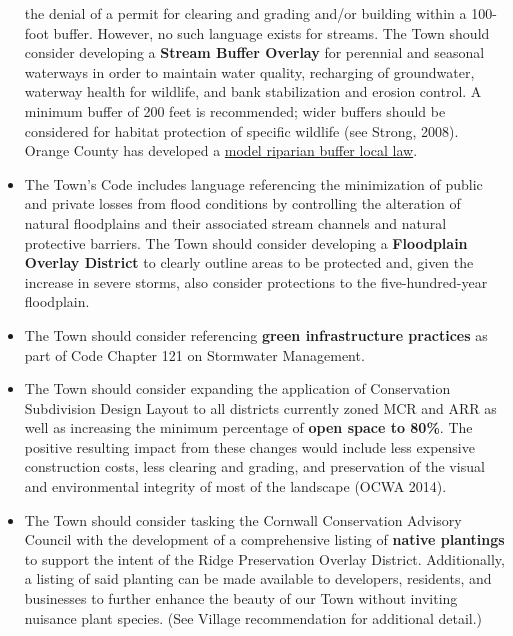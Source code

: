 \begin{itemize}
    the denial of a permit for clearing and grading and/or building within a 
    100-foot buffer. However, no such language exists for streams. The Town 
    should consider developing a \textbf{Stream Buffer Overlay} for perennial and 
    seasonal waterways in order to maintain water quality, recharging of 
    groundwater, waterway health for wildlife, and bank stabilization and 
    erosion control. A minimum buffer of 200 feet is recommended; wider buffers 
    should be considered for habitat protection of specific wildlife (see
    Strong, 2008). Orange County has developed a
    \href{http://waterauthority.orangecountygov.com/PROJECTS/DESIGN_GUIDE/Model%20Code%20for%20water%20protection.pdf}{model
    riparian buffer local law}.
    \item The Town’s Code includes language referencing the minimization of 
    public and private losses from flood conditions by controlling the 
    alteration of natural floodplains and their associated stream channels 
    and natural protective barriers.  The Town should consider developing a 
    \textbf{Floodplain Overlay District} to clearly outline areas to be protected 
    and, given the increase in severe storms, also consider protections to 
    the five-hundred-year floodplain.
    \item The Town should consider referencing \textbf{green infrastructure practices} 
    as part of Code Chapter 121 on Stormwater Management.
    \item The Town should consider expanding the application of Conservation 
    Subdivision Design Layout to all districts currently zoned MCR and ARR as 
    well as increasing the minimum percentage of \textbf{open space to 80\%}. The 
    positive resulting impact from these changes would include less expensive 
    construction costs, less clearing and grading, and preservation of the 
    visual and environmental integrity of most of the landscape (OCWA 2014).
    \item The Town should consider tasking the Cornwall Conservation Advisory 
    Council with the development of a comprehensive listing of \textbf{native plantings} 
    to support the intent of the Ridge Preservation Overlay District. 
    Additionally, a listing of said planting can be made available to 
    developers, residents, and businesses to further enhance the beauty of our 
    Town without inviting nuisance plant species. (See Village recommendation 
    for additional detail.)
\end{itemize}

